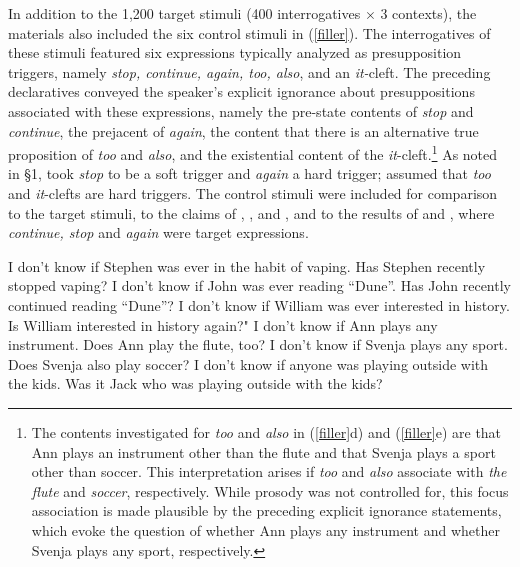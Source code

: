 \documentclass[11pt,fleqn]{article}
\newcommand{\6}{\mbox{$[\hspace*{-.6mm}[$}}
\newcommand{\9}{\mbox{$]\hspace*{-.6mm}]$}}
\begin{document}
In addition to the 1,200 target stimuli (400 interrogatives $\times$ 3 contexts), the materials also included the six control stimuli in (\ref{filler}). The interrogatives of these stimuli featured six expressions typically analyzed as presupposition triggers, namely {\em stop, continue, again, too, also}, and an {\em it-}cleft. The preceding declaratives conveyed the speaker's explicit ignorance about presuppositions associated with these expressions, namely the pre-state contents of \emph{stop} and \emph{continue}, the prejacent of \emph{again}, the content that there is an alternative true proposition of \emph{too} and \emph{also}, and the existential content of the \emph{it}-cleft.\footnote{The contents investigated for {\em too} and {\em also} in (\ref{filler}d) and (\ref{filler}e) are that Ann plays an instrument other than the flute and that Svenja plays a sport other than soccer. This interpretation arises if {\em too} and {\em also} associate with {\em the flute} and {\em soccer}, respectively. While prosody was not controlled for, this focus association is made plausible by the preceding explicit ignorance statements, which evoke the question of whether Ann plays any instrument and whether Svenja plays any sport, respectively.}  As noted in \S1, \citealt{simons01} took {\em stop} to be a soft trigger and \emph{again} a hard trigger; \citealt{abusch10} assumed that \emph{too} and \emph{it}-clefts are hard triggers. The control stimuli were included for comparison to the target stimuli, to the claims of \citealt{simons01}, \citealt{abusch10}, \citealt{abrusan2016} and \citealt{roberts-simons2024}, and to the results of \citealt[Exp.~3]{mandelkern-etal2020} and \citealt[Exps.~1-2]{kalomoiros-schwarz2024}, where  \emph{continue, stop} and \emph{again} were target expressions. 


\begin{exe}
\ex\label{filler} 
\begin{xlist}
\ex I don't know if Stephen was ever in the habit of vaping. Has Stephen recently stopped vaping?
\ex I don't know if John was ever reading ``Dune''. Has John recently continued reading ``Dune''?
\ex I don't know if William was ever interested in history. Is William interested in history again?"
\ex I don't know if Ann plays any instrument. Does Ann play the flute, too?
\ex I don't know if Svenja plays any sport. Does Svenja also play soccer?
\ex I don't know if anyone was playing outside with the kids. Was it Jack who was playing outside with the kids?

\end{xlist}
\end{exe}
\end{document}
